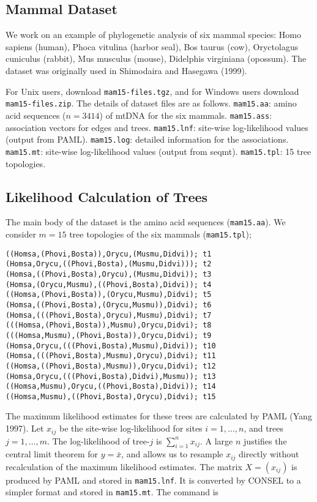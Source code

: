 \documentclass[a4paper]{amsart}
\begin{document}
\subsection{Mammal Dataset}

We work on an example of phylogenetic analysis of six mammal species:
Homo sapiens (human), Phoca vitulina (harbor seal), Bos taurus (cow),
Oryctolagus cuniculus (rabbit), Mus musculus (mouse), Didelphis
virginiana (opossum). The dataset was originally used in Shimodaira
and Hasegawa (1999). 

For Unix users, download {\tt mam15-files.tgz}, and for Windows users
download {\tt mam15-files.zip}.  The details of dataset files are as
follows.  {\tt mam15.aa}: amino acid sequences ($n=3414$) of mtDNA for
the six mammals.  {\tt mam15.ass}: association vectors for edges and
trees.  {\tt mam15.lnf}: site-wise log-likelihood values (output from
PAML).  {\tt mam15.log}: detailed information for the associations.
{\tt mam15.mt}: site-wise log-likelihood values (output from seqmt).
{\tt mam15.tpl}: 15 tree topologies.

\subsection{Likelihood Calculation of Trees}

The main body of the dataset is the amino acid sequences ({\tt mam15.aa}).
We  consider $m=15$ tree topologies of the six mammals ({\tt mam15.tpl});
\begin{verbatim}  
((Homsa,(Phovi,Bosta)),Orycu,(Musmu,Didvi)); t1
(Homsa,Orycu,((Phovi,Bosta),(Musmu,Didvi))); t2
(Homsa,((Phovi,Bosta),Orycu),(Musmu,Didvi)); t3
(Homsa,(Orycu,Musmu),((Phovi,Bosta),Didvi)); t4
((Homsa,(Phovi,Bosta)),(Orycu,Musmu),Didvi); t5
(Homsa,((Phovi,Bosta),(Orycu,Musmu)),Didvi); t6
(Homsa,(((Phovi,Bosta),Orycu),Musmu),Didvi); t7
(((Homsa,(Phovi,Bosta)),Musmu),Orycu,Didvi); t8
(((Homsa,Musmu),(Phovi,Bosta)),Orycu,Didvi); t9
(Homsa,Orycu,(((Phovi,Bosta),Musmu),Didvi)); t10
(Homsa,(((Phovi,Bosta),Musmu),Orycu),Didvi); t11
((Homsa,((Phovi,Bosta),Musmu)),Orycu,Didvi); t12
(Homsa,Orycu,(((Phovi,Bosta),Didvi),Musmu)); t13
((Homsa,Musmu),Orycu,((Phovi,Bosta),Didvi)); t14
((Homsa,Musmu),((Phovi,Bosta),Orycu),Didvi); t15
\end{verbatim}
The maximum likelihood estimates for these trees are calculated by
PAML (Yang 1997).  Let $x_{ij}$ be the site-wise log-likelihood for
sites $i=1,\ldots,n$, and trees $j=1,\ldots,m$. The log-likelihood of
tree-$j$ is $\sum_{i=1}^n x_{ij}$. A large $n$ justifies the central
limit theorem for $y=\bar x$, and allows us to resample $x_{ij}$
directly without recalculation of the maximum likelihood
estimates. The matrix $X=(x_{ij})$ is produced by PAML and stored in
{\tt mam15.lnf}.  It is converted by CONSEL to a simpler format and
stored in {\tt mam15.mt}. The command is
\end{document}
